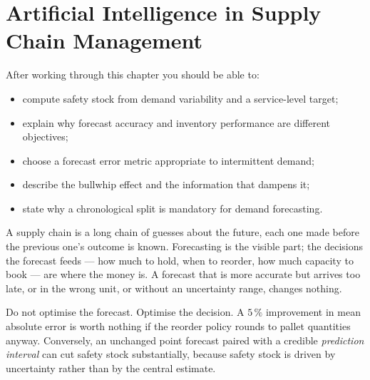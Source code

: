 
\chapter{Artificial Intelligence in Supply Chain Management}


\label{ch:supply-chain}

\begin{learningobjectives}
After working through this chapter you should be able to:
\begin{itemize}
  \item compute safety stock from demand variability and a service-level
        target;
  \item explain why forecast accuracy and inventory performance are different
        objectives;
  \item choose a forecast error metric appropriate to intermittent demand;
  \item describe the bullwhip effect and the information that dampens it;
  \item state why a chronological split is mandatory for demand forecasting.
\end{itemize}
\end{learningobjectives}

\begin{plainlanguage}
A supply chain is a long chain of guesses about the future, each one made
before the previous one's outcome is known. Forecasting is the visible part;
the decisions the forecast feeds --- how much to hold, when to reorder, how much
capacity to book --- are where the money is. A forecast that is more accurate
but arrives too late, or in the wrong unit, or without an uncertainty range,
changes nothing.
\end{plainlanguage}

\begin{engineernote}
Do not optimise the forecast. Optimise the decision. A $5\,\%$ improvement in
mean absolute error is worth nothing if the reorder policy rounds to pallet
quantities anyway. Conversely, an unchanged point forecast paired with a
credible \emph{prediction interval} can cut safety stock substantially, because
safety stock is driven by uncertainty rather than by the central estimate.
\end{engineernote}

